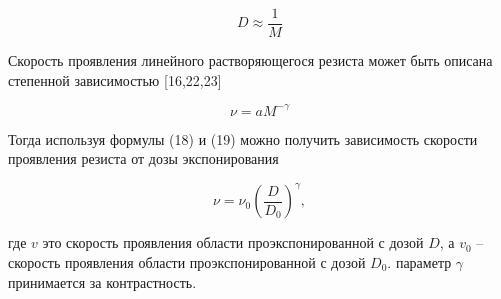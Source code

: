 \begin{equation}
D\approx \frac{1}{M}
\label{eq:A18}
\end{equation}

Скорость проявления линейного растворяющегося резиста может быть описана степенной зависимостью [16,22,23]

\begin{equation}
\nu=aM^{-\gamma}
\label{eq:A19}
\end{equation}

Тогда используя формулы (18) и (19) можно получить зависимость скорости проявления резиста от дозы экспонирования 

\begin{equation}
\nu=\nu_0\left(\frac{D}{D_0}\right)^\gamma,
\label{eq:A20}
\end{equation}

где $v$ это скорость проявления области проэкспонированной с дозой $D$, а $v_0$ -- скорость проявления области проэкспонированной с дозой $D_0$. параметр $\gamma$ принимается за контрастность. 

